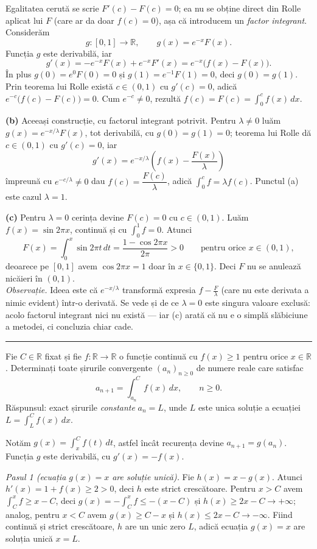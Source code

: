 Egalitatea cerută se scrie $F'(c)-F(c)=0$; ea nu se obține direct din Rolle
aplicat lui $F$ (care ar da doar $f(c)=0$), așa că introducem un \emph{factor
integrant}. Considerăm
\[ g:[0,1]\to\mathbb{R},\qquad g(x)=e^{-x}F(x). \]
Funcția $g$ este derivabilă, iar
\[ g'(x)=-e^{-x}F(x)+e^{-x}F'(x)=e^{-x}\bigl(f(x)-F(x)\bigr). \]
În plus $g(0)=e^{0}F(0)=0$ și $g(1)=e^{-1}F(1)=0$, deci $g(0)=g(1)$. Prin teorema
lui Rolle există $c\in(0,1)$ cu $g'(c)=0$, adică $e^{-c}\bigl(f(c)-F(c)\bigr)=0$.
Cum $e^{-c}\neq0$, rezultă $f(c)=F(c)=\int_0^c f(x)\,dx$.

\noindent\textbf{(b)} Aceeași construcție, cu factorul integrant potrivit. Pentru
$\lambda\neq0$ luăm $g(x)=e^{-x/\lambda}F(x)$, tot derivabilă, cu $g(0)=g(1)=0$;
teorema lui Rolle dă $c\in(0,1)$ cu $g'(c)=0$, iar
\[ g'(x)=e^{-x/\lambda}\left(f(x)-\frac{F(x)}{\lambda}\right) \]
împreună cu $e^{-c/\lambda}\neq0$ dau $f(c)=\dfrac{F(c)}{\lambda}$, adică
$\int_0^c f=\lambda f(c)$. Punctul (a) este cazul $\lambda=1$.

\noindent\textbf{(c)} Pentru $\lambda=0$ cerința devine $F(c)=0$ cu $c\in(0,1)$.
Luăm $f(x)=\sin 2\pi x$, continuă și cu $\int_0^1 f=0$. Atunci
\[ F(x)=\int_0^x \sin 2\pi t\,dt=\frac{1-\cos 2\pi x}{2\pi}>0
   \qquad\text{pentru orice } x\in(0,1), \]
deoarece pe $[0,1]$ avem $\cos 2\pi x=1$ doar în $x\in\{0,1\}$. Deci $F$ nu se
anulează nicăieri în $(0,1)$.\\[2pt]
\emph{Observație.} Ideea este că $e^{-x/\lambda}$ transformă expresia
$f-\frac F\lambda$ (care nu este derivata a nimic evident) într-o derivată. Se
vede și de ce $\lambda=0$ este singura valoare exclusă: acolo factorul integrant
nici nu există --- iar (c) arată că nu e o simplă slăbiciune a metodei, ci
concluzia chiar cade.
\vspace{1mm}\hrule

Fie $C\in\mathbb{R}$ fixat și fie $f:\mathbb{R}\to\mathbb{R}$ o funcție continuă
cu $f(x)\ge1$ pentru orice $x\in\mathbb{R}$. Determinați toate șirurile
convergente $(a_n)_{n\ge0}$ de numere reale care satisfac
\[ a_{n+1}=\int_{a_n}^{C}f(x)\,dx,\qquad n\ge0 . \]
\sol Răspunsul: exact șirurile \emph{constante} $a_n=L$, unde $L$ este unica
soluție a ecuației $L=\int_L^{C}f(x)\,dx$.

Notăm $g(x)=\int_x^{C}f(t)\,dt$, astfel încât recurența devine $a_{n+1}=g(a_n)$.
Funcția $g$ este derivabilă, cu $g'(x)=-f(x)$.

\noindent\textit{Pasul 1 (ecuația $g(x)=x$ are soluție unică).} Fie $h(x)=x-g(x)$.
Atunci $h'(x)=1+f(x)\ge2>0$, deci $h$ este strict crescătoare. Pentru $x>C$ avem
$\int_C^x f\ge x-C$, deci $g(x)=-\int_C^x f\le-(x-C)$ și $h(x)\ge2x-C\to+\infty$;
analog, pentru $x<C$ avem $g(x)\ge C-x$ și $h(x)\le2x-C\to-\infty$. Fiind
continuă și strict crescătoare, $h$ are un unic zero $L$, adică ecuația
$g(x)=x$ are soluția unică $x=L$.

